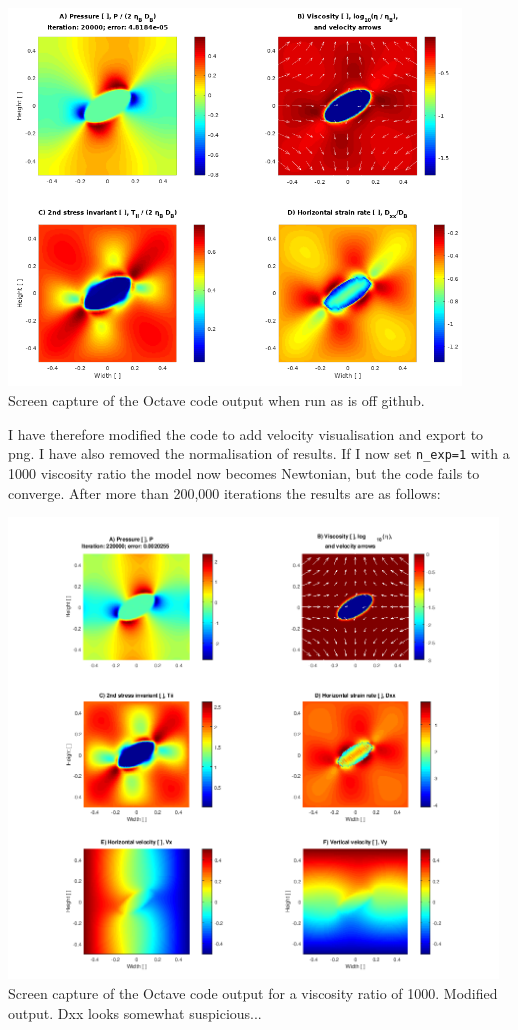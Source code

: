 \begin{center}
\includegraphics[width=12cm]{python_codes/fieldstone_142/images/octave1}\\
{\captionfont Screen capture of the Octave code output when run as is off github.}
\end{center}

I have therefore modified the code to add velocity visualisation and export to png.
I have also removed the normalisation of results.
If I now set \verb|n_exp=1| with a 1000 viscosity ratio the model now becomes Newtonian,
but the code fails to converge. After more than 200,000 iterations the results are as 
follows:

\begin{center}
\includegraphics[width=13cm]{python_codes/fieldstone_142/images/octave2}\\
{\captionfont Screen capture of the Octave code output for a viscosity ratio of 1000.
Modified output. Dxx looks somewhat suspicious...}
\end{center}

